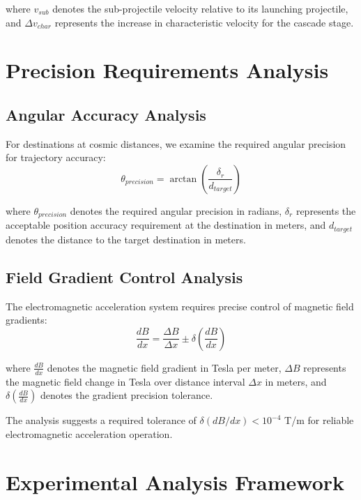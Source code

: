 \documentclass[12pt,a4paper]{article}
\begin{document}
where $v_{sub}$ denotes the sub-projectile velocity relative to its launching projectile, and $\Delta v_{char}$ represents the increase in characteristic velocity for the cascade stage.

\section{Precision Requirements Analysis}

\subsection{Angular Accuracy Analysis}

For destinations at cosmic distances, we examine the required angular precision for trajectory accuracy:
\begin{equation}
\theta_{precision} = \arctan\left(\frac{\delta_r}{d_{target}}\right)
\end{equation}

where $\theta_{precision}$ denotes the required angular precision in radians, $\delta_r$ represents the acceptable position accuracy requirement at the destination in meters, and $d_{target}$ denotes the distance to the target destination in meters.

\subsection{Field Gradient Control Analysis}

The electromagnetic acceleration system requires precise control of magnetic field gradients:
\begin{equation}
\frac{dB}{dx} = \frac{\Delta B}{\Delta x} \pm \delta\left(\frac{dB}{dx}\right)
\end{equation}

where $\frac{dB}{dx}$ denotes the magnetic field gradient in Tesla per meter, $\Delta B$ represents the magnetic field change in Tesla over distance interval $\Delta x$ in meters, and $\delta\left(\frac{dB}{dx}\right)$ denotes the gradient precision tolerance.

The analysis suggests a required tolerance of $\delta(dB/dx) < 10^{-4}$ T/m for reliable electromagnetic acceleration operation.

\section{Experimental Analysis Framework}
\end{document}
